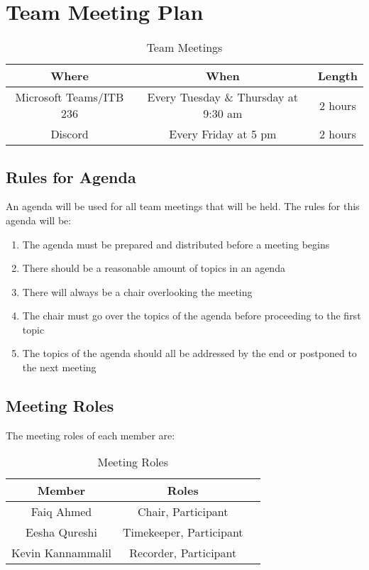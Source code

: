 \documentclass[12pt,letterpaper]{article}
\begin{document}
\section{Team Meeting Plan}
\begin{table}[H]
    \centering
    \begin{tabular}{ |c|c|c| } 
    \hline
    Where & When & Length \\
    \hline
    Microsoft Teams/ITB 236 & Every Tuesday \& Thursday at 9:30 am & 2 hours \\
    Discord & Every Friday at 5 pm & 2 hours \\
    \hline
    \end{tabular}
    \caption{Team Meetings}
    \label{tab:teammeetings}
\end{table}

\subsection{Rules for Agenda}

An agenda will be used for all team meetings that will be held. The rules for this agenda will be: 

\begin{enumerate}
    \item The agenda must be prepared and distributed before a meeting begins
    \item There should be a reasonable amount of topics in an agenda 
    \item There will always be a chair overlooking the meeting
    \item The chair must go over the topics of the agenda before proceeding to the first topic
    \item The topics of the agenda should all be addressed by the end or postponed to the next meeting 
\end{enumerate}

\subsection{Meeting Roles}

The meeting roles of each member are: 

\begin{table}[H]
    \centering
    \begin{tabular}{ |c|c|c| } 
    \hline
    Member & Roles \\
    \hline
    Faiq Ahmed & Chair, Participant\\
    Eesha Qureshi & Timekeeper, Participant \\
    Kevin Kannammalil & Recorder, Participant \\
    \hline
    \end{tabular}
    \caption{Meeting Roles}
    \label{tab:meetingroles}
\end{table}
\end{document}
